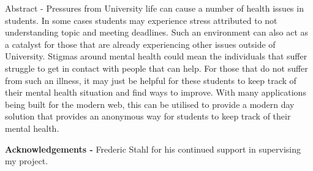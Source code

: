 \noindent
\begin{itshape}
    Abstract - Pressures from University life can cause a number of health issues in students.
    In some cases students may experience stress attributed to not understanding topic and meeting deadlines.
    Such an environment can also act as a catalyst for those that are already experiencing other issues outside of University.
    Stigmas around mental health could mean the individuals that suffer struggle to get in contact with people that can help.
    For those that do not suffer from such an illness, it may just be helpful for these students to keep track of their
    mental health situation and find ways to improve.
    With many applications being built for the modern web, this can be utilised to provide a modern day solution that provides 
    an anonymous way for students to keep track of their mental health.
\end{itshape}

\vspace{0.5cm}
\noindent
\textbf{Acknowledgements - }Frederic Stahl for his continued support in supervising my project.